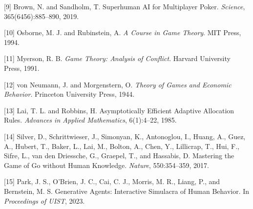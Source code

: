 \documentclass{article}
\begin{document}
[9] Brown, N. and Sandholm, T. Superhuman AI for Multiplayer Poker. \emph{Science}, 365(6456):885--890, 2019.

[10] Osborne, M. J. and Rubinstein, A. \emph{A Course in Game Theory}. MIT Press, 1994.

[11] Myerson, R. B. \emph{Game Theory: Analysis of Conflict}. Harvard University Press, 1991.

[12] von Neumann, J. and Morgenstern, O. \emph{Theory of Games and Economic Behavior}. Princeton University Press, 1944.

[13] Lai, T. L. and Robbins, H. Asymptotically Efficient Adaptive Allocation Rules. \emph{Advances in Applied Mathematics}, 6(1):4--22, 1985.

[14] Silver, D., Schrittwieser, J., Simonyan, K., Antonoglou, I., Huang, A., Guez, A., Hubert, T., Baker, L., Lai, M., Bolton, A., Chen, Y., Lillicrap, T., Hui, F., Sifre, L., van den Driessche, G., Graepel, T., and Hassabis, D. Mastering the Game of Go without Human Knowledge. \emph{Nature}, 550:354--359, 2017.

[15] Park, J. S., O'Brien, J. C., Cai, C. J., Morris, M. R., Liang, P., and Bernstein, M. S. Generative Agents: Interactive Simulacra of Human Behavior. In \emph{Proceedings of UIST}, 2023.
\end{document}
